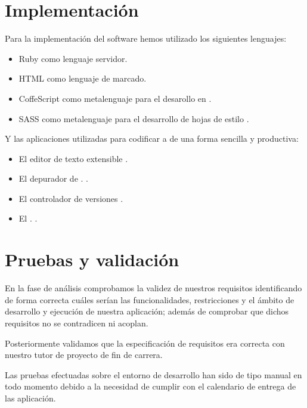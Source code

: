 \newpage

\clearpage
\section{Implementación}
Para la implementación del software hemos utilizado los siguientes lenguajes:

\begin{itemize}
\item Ruby como lenguaje servidor.
\item HTML como lenguaje de marcado.
\item CoffeScript como metalenguaje para el desarollo en \cite{lang:coffescript}.
\item SASS como metalenguaje para el desarrollo de hojas de estilo \cite{lang:sass}.
\end{itemize}

Y las aplicaciones utilizadas para codificar a de una forma sencilla y
productiva:

\begin{itemize}
\item El editor de texto extensible  \cite{prog:sublimetext2}.
\item El depurador de  \cite{prog:firefox} .
  \cite{prog:firebug}.
\item El controlador de versiones  \cite{wiki:GIT}.
\item El  .
  \cite{prog:twitter_bootstrap}.
\end{itemize}

\section{Pruebas y validación}
En la fase de análisis comprobamos la validez de nuestros requisitos
identificando de forma correcta cuáles serían las funcionalidades, restricciones
y el ámbito de desarrollo y ejecución de nuestra aplicación; además de comprobar
que dichos requisitos no se contradicen ni acoplan.

Posteriormente validamos que la especificación de requisitos era correcta con
nuestro tutor de proyecto de fin de carrera.

Las pruebas efectuadas sobre el entorno de desarrollo han sido de tipo manual en
todo momento debido a la necesidad de cumplir con el calendario de entrega de
las aplicación.

